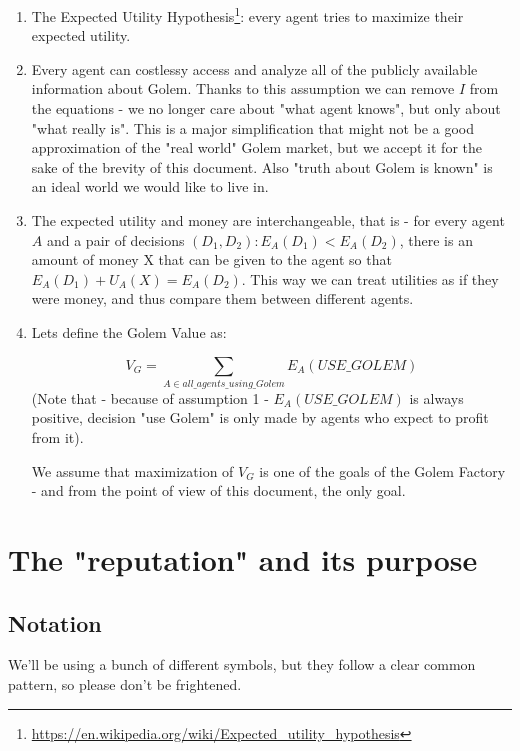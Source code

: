 \documentclass{article}
\begin{document}
\begin{enumerate}
\item The Expected Utility Hypothesis\footnote{\href{https://en.wikipedia.org/wiki/Expected\_utility\_hypothesis}{https://en.wikipedia.org/wiki/Expected\_utility\_hypothesis}}: every agent tries to maximize their expected utility.

\item Every agent can costlessy access and analyze all of the publicly available information about Golem. Thanks to this assumption we can remove $I$ from the equations - we no longer
    care about "what agent knows", but only about "what really is". This is a major simplification that might not be a good approximation of the "real world" Golem market, but we
    accept it for the sake of the brevity of this document. Also "truth about Golem is known" is an ideal world we would like to live in.

\item The expected utility and money are interchangeable, that is - for every agent $A$ and a pair of decisions $(D_1, D_2): E_A(D_1) < E_A(D_2)$, there is an amount of money X that
    can be given to the agent so that $E_A(D_1) + U_A(X) = E_A(D_2)$. This way we can treat utilities as if they were money, and thus compare them between different agents.

\item Lets define the Golem Value as:

\begin{equation}
    V_G = \sum_{A \in all\_agents\_using\_Golem}E_A(USE\_GOLEM)
\end{equation}
(Note that - because of assumption 1 - $E_A(USE\_GOLEM)$ is always positive, decision "use Golem" is only made by agents who expect to profit from it).

We assume that maximization of $V_G$ is one of the goals of the Golem Factory - and from the point of view of this document, the only goal.
\end{enumerate}

\section{The "reputation" and its purpose}
\subsection{Notation}

We'll be using a bunch of different symbols, but they follow a clear common pattern, so please don't be frightened.
\end{document}

